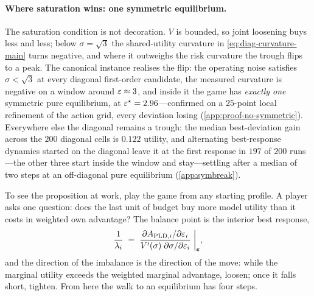 \paragraph{Where saturation wins: one symmetric equilibrium.} The
saturation condition is not decoration. $V$ is bounded, so joint
loosening buys less and less; below $\sigma = \sqrt 3$ the shared-utility
curvature in \eqref{eq:diag-curvature-main} turns negative, and
where it outweighs the risk curvature the trough flips to a peak.
The canonical instance realises the flip: the operating noise
satisfies $\sigma < \sqrt 3$ at every diagonal first-order
candidate, the measured curvature is negative on a window around
$\varepsilon \approx 3$, and inside it the game has \emph{exactly one}
symmetric pure equilibrium, at $\varepsilon^\star = 2.96$---confirmed on a
$25$-point local refinement of the action grid, every deviation
losing (\cref{app:proof-no-symmetric}). Everywhere else the
diagonal remains a trough: the median best-deviation gain across
the $200$ diagonal cells is $0.122$ utility, and alternating
best-response dynamics started on the diagonal leave it at the
first response in $197$ of $200$ runs---the other three start
inside the window and stay---settling after a median of two steps
at an off-diagonal pure equilibrium (\cref{app:symbreak}).

To see the proposition at work, play the game from any starting
profile. A player asks one question: does the last unit of budget
buy more model utility than it costs in weighted own advantage?
The balance point is the interior best response,
\begin{equation}
\frac{1}{\lambda_i}
\;=\; \frac{ \partial A_{\mathrm{PLD},i} / \partial \varepsilon_i }
          { V'(\sigma)\;\partial \sigma / \partial \varepsilon_i }
\;\bigg|_{\boldsymbol{\varepsilon}},
\label{eq:foc}
\end{equation}
and the direction of the imbalance is the direction of the move:
while the marginal utility exceeds the weighted marginal
advantage, loosen; once it falls short, tighten. From here the
walk to an equilibrium has four steps.


